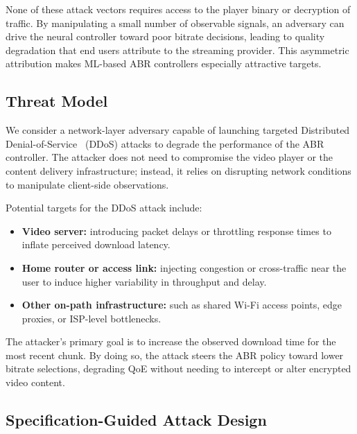 \documentclass[thesis]{uofithesis} %
\begin{document}
    None of these attack vectors requires access to the player binary or
    decryption of traffic.  By manipulating a small number of observable
    signals, an adversary can drive the neural controller toward poor
    bitrate decisions, leading to quality degradation that end users
    attribute to the streaming provider.  This asymmetric attribution makes
    ML-based ABR controllers especially attractive targets.
    
    
    \subsection{Threat Model}
    \label{sec:threat-model}
    
    We consider a network-layer adversary capable of launching targeted
    Distributed Denial-of-Service~\cite{ddos} (DDoS) attacks to degrade the
    performance of the ABR controller.  The attacker does not need to
    compromise the video player or the content delivery infrastructure;
    instead, it relies on disrupting network conditions to manipulate
    client-side observations.
    
    Potential targets for the DDoS attack include:
    \begin{itemize}
        \item \textbf{Video server:} introducing packet delays or throttling
            response times to inflate perceived download latency.
        \item \textbf{Home router or access link:} injecting congestion or
            cross-traffic near the user to induce higher variability in
            throughput and delay.
        \item \textbf{Other on-path infrastructure:} such as shared Wi-Fi
            access points, edge proxies, or ISP-level bottlenecks.
    \end{itemize}
    
    The attacker's primary goal is to increase the observed download
    time for the most recent chunk.  By doing so, the attack steers the
    ABR policy toward lower bitrate selections, degrading QoE without
    needing to intercept or alter encrypted video content.


    \subsection{Specification-Guided Attack Design}
    \label{sec:attack-design}
    
\end{document}
